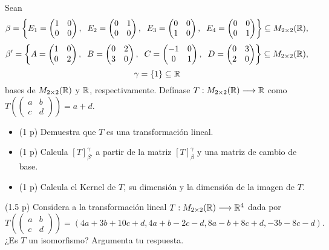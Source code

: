 \begin{prob}
Sean 
$$
\beta =
 \left\{
E_{1}= \begin{pmatrix}
1 & 0 \\
0 & 0
\end{pmatrix}, \hspace{0.2cm}
E_{2} = \begin{pmatrix}
0 & 1 \\
0 & 0
\end{pmatrix}, \hspace{0.2cm}
E_{3}= \begin{pmatrix}
0 & 0 \\
1 & 0
\end{pmatrix}, \hspace{0.2cm}
E_{4} = \begin{pmatrix}
0 & 0 \\
0 & 1
\end{pmatrix}
\right\} \subseteq M_{2 \times 2}(\mathbb{R}),
$$
$$
\beta' =
 \left\{
A= \begin{pmatrix}
1 & 0 \\
0 & 2
\end{pmatrix}, \hspace{0.2cm}
B= \begin{pmatrix}
0 & 2 \\
3 & 0
\end{pmatrix}, \hspace{0.2cm}
C= \begin{pmatrix}
-1 & 0 \\
0 & 1
\end{pmatrix}, \hspace{0.2cm}
D= \begin{pmatrix}
0 & 3 \\
2 & 0
\end{pmatrix}
\right\} \subseteq M_{2 \times 2}(\mathbb{R}),
$$
$$
\gamma = \{ 1 \} \subseteq \mathbb{R}
$$
bases de $M_{2 \times 2}(\mathbb{R})$ y $\mathbb{R}$, respectivamente.
Defínase $T: M_{2 \times 2}(\mathbb{R}) \longrightarrow \mathbb{R}$ como
$
T \left( \begin{pmatrix}
a & b \\
c & d
\end{pmatrix} \right) = a + d.
$
\begin{itemize}
	\item (1 p) Demuestra que $T$ es una transformación lineal.
	\item (1 p) Calcula $[T]_{\beta'}^{\gamma}$ a partir de la matriz
	$[T]_{\beta}^{\gamma}$ y una matriz de cambio de base.
	\item (1 p) Calcula el Kernel de $T$, su dimensión
	y la dimensión de la imagen de $T$.
\end{itemize}
\end{prob}

\begin{prob}
(1.5 p)
Considera a la transformación lineal $T: M_{2 \times 2}(\mathbb{R}) 
\longrightarrow \mathbb{R}^{4}$ dada por
\[
T 
\left(
\begin{pmatrix}
a & b \\
c & d
\end{pmatrix}
\right)
= (4a+3b+10c+d, 4a+b-2c-d, 8a-b+8c+d, -3b-8c-d).
\]
¿Es $T$ un isomorfismo? Argumenta tu respuesta.
\end{prob}